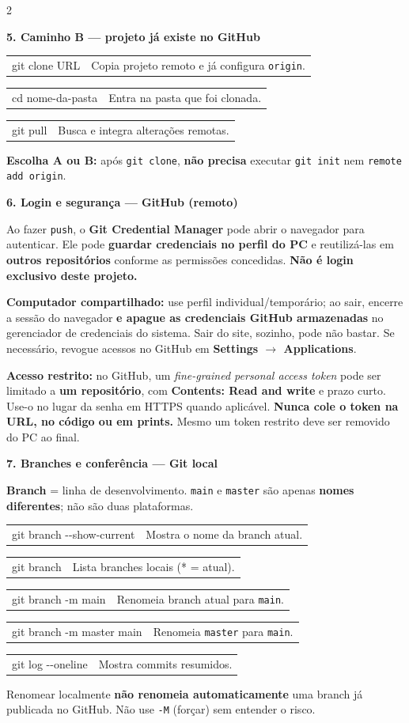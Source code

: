 \documentclass[11pt,a4paper]{article}
\makeatletter
\newcommand{\cheatsect}[2]{\textbf{\fontsize{8.6}{9.8}\selectfont\color{#1}#2}\par\vspace{0.5mm}}
\newcommand{\cheatnote}[1]{{\fontsize{7.8}{9}\selectfont#1}\par}
\newcommand{\cheatcmd}[2]{\noindent\begin{tabularx}{\linewidth}{@{}>{\raggedright\arraybackslash}p{.58\linewidth}@{\hspace{1.2mm}}>{\raggedright\arraybackslash}X@{}}\ttfamily\fontsize{7.8}{9}\selectfont#1 & \fontsize{7.8}{9}\selectfont#2\end{tabularx}\vspace{0.3mm}}
\makeatother
\begin{document}
\begin{multicols}{2}
\begin{tcolorbox}[cheatbox]
\cheatsect{PrimaryBlue}{5. Caminho B --- projeto já existe no GitHub}
\cheatcmd{git clone URL}{Copia projeto remoto e já configura \texttt{origin}.}
\cheatcmd{cd nome-da-pasta}{Entra na pasta que foi clonada.}
\cheatcmd{git pull}{Busca e integra alterações remotas.}
\cheatnote{\textbf{Escolha A ou B:} após \texttt{git clone}, \textbf{não precisa} executar \texttt{git init} nem \texttt{remote add origin}.}
\end{tcolorbox}

\begin{tcolorbox}[cheatbox]
\cheatsect{PrimaryBlue}{6. Login e segurança --- GitHub (remoto)}
\cheatnote{Ao fazer \texttt{push}, o \textbf{Git Credential Manager} pode abrir o navegador para autenticar. Ele pode \textbf{guardar credenciais no perfil do PC} e reutilizá-las em \textbf{outros repositórios} conforme as permissões concedidas. \textbf{Não é login exclusivo deste projeto.}}
\cheatnote{\textbf{Computador compartilhado:} use perfil individual/temporário; ao sair, encerre a sessão do navegador \textbf{e apague as credenciais GitHub armazenadas} no gerenciador de credenciais do sistema. Sair do site, sozinho, pode não bastar. Se necessário, revogue acessos no GitHub em \textbf{Settings $\rightarrow$ Applications}.}
\cheatnote{\textbf{Acesso restrito:} no GitHub, um \textit{fine-grained personal access token} pode ser limitado a \textbf{um repositório}, com \textbf{Contents: Read and write} e prazo curto. Use-o no lugar da senha em HTTPS quando aplicável. \textbf{Nunca cole o token na URL, no código ou em prints.} Mesmo um token restrito deve ser removido do PC ao final.}
\end{tcolorbox}

\begin{tcolorbox}[cheatboxlocal]
\cheatsect{DarkGray}{7. Branches e conferência --- Git local}
\cheatnote{\textbf{Branch} = linha de desenvolvimento. \texttt{main} e \texttt{master} são apenas \textbf{nomes diferentes}; não são duas plataformas.}
\cheatcmd{git branch -{}-show-current}{Mostra o nome da branch atual.}
\cheatcmd{git branch}{Lista branches locais (* = atual).}
\cheatcmd{git branch -m main}{Renomeia branch atual para \texttt{main}.}
\cheatcmd{git branch -m master main}{Renomeia \texttt{master} para \texttt{main}.}
\cheatcmd{git log -{}-oneline}{Mostra commits resumidos.}
\cheatnote{Renomear localmente \textbf{não renomeia automaticamente} uma branch já publicada no GitHub. Não use \texttt{-M} (forçar) sem entender o risco.}
\end{tcolorbox}


\end{multicols}
\end{document}
